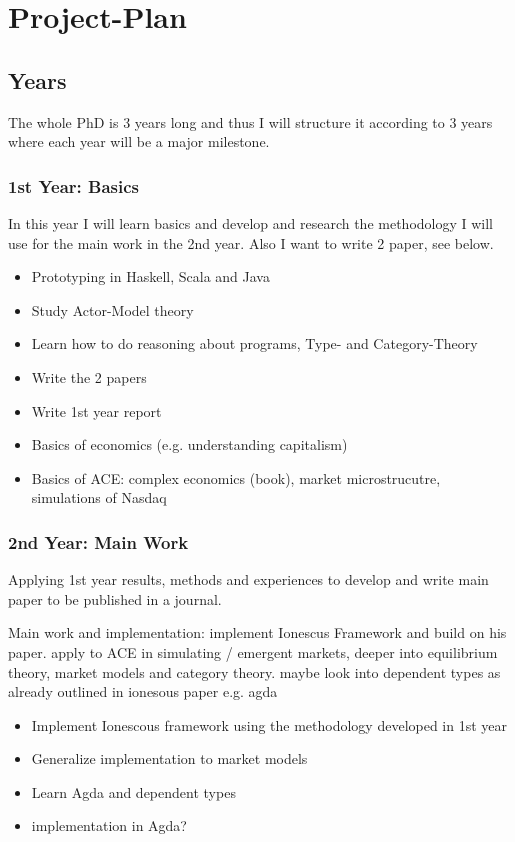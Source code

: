 \section{Project-Plan}

\subsection{Years}
The whole PhD is 3 years long and thus I will structure it according to 3 years where each year will be a major milestone.
 
\subsubsection{1st Year: Basics}
In this year I will learn basics and develop and research the methodology I will use for the main work in the 2nd year. Also I want to write 2 paper, see below.

\begin{itemize}
\item Prototyping in Haskell, Scala and Java
\item Study Actor-Model theory
\item Learn how to do reasoning about programs, Type- and Category-Theory
\item Write the 2 papers
\item Write 1st year report
\item Basics of economics (e.g. understanding capitalism)
\item Basics of ACE: complex economics (book), market microstrucutre, simulations of Nasdaq
\end{itemize}

\subsubsection{2nd Year: Main Work}
Applying 1st year results, methods and experiences to develop and write main paper to be published in a journal.
 
Main work and implementation:
implement Ionescus Framework and build on his paper.
apply to ACE in simulating / emergent markets, deeper into equilibrium theory, market models and category theory. maybe look into dependent types as already outlined in ionesous paper e.g. agda
 
\begin{itemize}
\item Implement Ionescous framework using the methodology developed in 1st year
\item Generalize implementation to market models
\item Learn Agda and dependent types
\item implementation in Agda?
\end{itemize}
 
